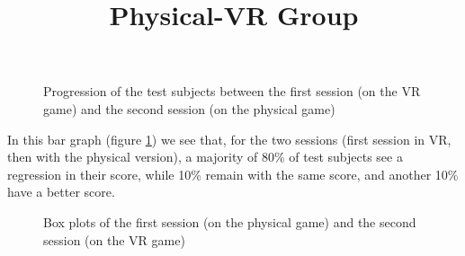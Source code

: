 \documentclass[12pt, openany, twocolumn]{article}
\begin{document}
                \begin{figure}[H]
                    \centering
                    \setlength{\fboxsep}{0pt}
                    \caption{Progression of the test subjects between the first session (on the VR game) and the second session (on the physical game)}
                    \label{figure14}
                \end{figure}

            In this bar graph (figure \ref{figure14}) we see that, for the two sessions (first session in VR, then with the physical version), a majority of 80\% of test subjects see a regression in their score, while 10\% remain with the same score, and another 10\% have a better score.
            \\

            \noindent \title{\textbf{Physical-VR Group}}          
                \begin{figure}[H]
                    \centering
                    \setlength{\fboxsep}{0pt}
                    \caption{Box plots of the first session (on the physical game) and the second session (on the VR game)}
                    \label{figure15}
                \end{figure}
            
\end{document}
